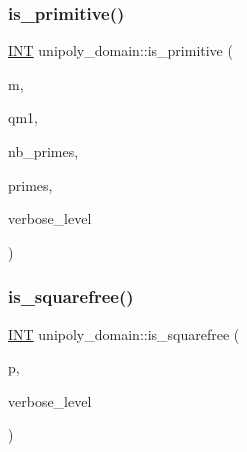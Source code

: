 \mbox{\label{classunipoly__domain_af8906b082da4df6b67d1f86b76ca1a89}} 
\subsubsection{\texorpdfstring{is\+\_\+primitive()}{is\_primitive()}}
{\footnotesize\ttfamily \mbox{\hyperlink{galois_8h_a09fddde158a3a20bd2dcadb609de11dc}{I\+NT}} unipoly\+\_\+domain\+::is\+\_\+primitive (\begin{DoxyParamCaption}\item[{\mbox{\hyperlink{galois_8h_a77ca58de3d2da6172242493dd9c8aaa8}{unipoly\+\_\+object}} \&}]{m,  }\item[{\mbox{\hyperlink{classlonginteger__object}{longinteger\+\_\+object}} \&}]{qm1,  }\item[{\mbox{\hyperlink{galois_8h_a09fddde158a3a20bd2dcadb609de11dc}{I\+NT}}}]{nb\+\_\+primes,  }\item[{\mbox{\hyperlink{classlonginteger__object}{longinteger\+\_\+object}} $\ast$}]{primes,  }\item[{\mbox{\hyperlink{galois_8h_a09fddde158a3a20bd2dcadb609de11dc}{I\+NT}}}]{verbose\+\_\+level }\end{DoxyParamCaption})}

\mbox{\label{classunipoly__domain_afb9cdaba701abb9f9813fe0039b4b1dd}} 
\subsubsection{\texorpdfstring{is\+\_\+squarefree()}{is\_squarefree()}}
{\footnotesize\ttfamily \mbox{\hyperlink{galois_8h_a09fddde158a3a20bd2dcadb609de11dc}{I\+NT}} unipoly\+\_\+domain\+::is\+\_\+squarefree (\begin{DoxyParamCaption}\item[{\mbox{\hyperlink{galois_8h_a77ca58de3d2da6172242493dd9c8aaa8}{unipoly\+\_\+object}}}]{p,  }\item[{\mbox{\hyperlink{galois_8h_a09fddde158a3a20bd2dcadb609de11dc}{I\+NT}}}]{verbose\+\_\+level }\end{DoxyParamCaption})}

